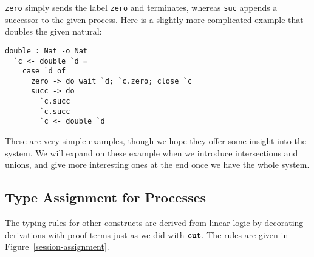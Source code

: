 \documentclass[a4paper,USenglish]{lipics-v2016}
\begin{document}
\texttt{zero} simply sends the label \texttt{zero} and terminates, whereas \texttt{suc} appends a successor to the given process. Here is a slightly more complicated example that doubles the given natural:

\begin{lstlisting}[language=krill, style=custom]
  double : Nat -o Nat
  `c <- double `d =
    case `d of
      zero -> do wait `d; `c.zero; close `c
      succ -> do
        `c.succ
        `c.succ
        `c <- double `d
\end{lstlisting}

These are very simple examples, though we hope they offer some insight into the system. We will expand on these example when we introduce intersections and unions, and give more interesting ones at the end once we have the whole system.


\subsection{Type Assignment for Processes}

The typing rules for other constructs are derived from linear logic by decorating derivations with proof terms just as we did with $\texttt{cut}$. The rules are given in Figure~\ref{session-assignment}. 

\end{document}
